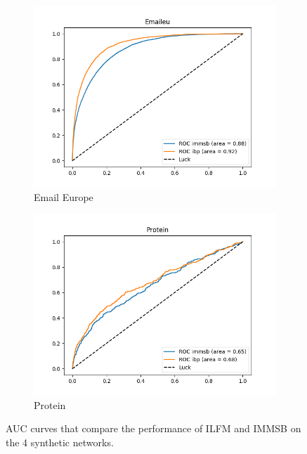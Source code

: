 \begin{figure}[h]
\begin{subfigure}[b]{0.300\textwidth}
            \includegraphics[width=\textwidth]{img/corpus/roc_emaileu}
            \caption {{\small Email Europe}}    
            \label{fig:mean and std of net14}
        \end{subfigure}
        \begin{subfigure}[b]{0.300\textwidth}
            \centering
            \includegraphics[width=\textwidth]{img/corpus/roc_propro}
            \caption {{\small Protein}}    
            \label{fig:mean and std of net14}
        \end{subfigure}
	\caption{AUC curves that compare the performance of ILFM and IMMSB on the 4 synthetic networks.}
	\label{fig:auc}
\end{figure}
